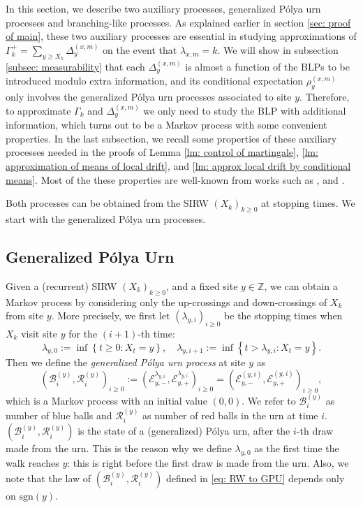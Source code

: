 \documentclass[EJP]{ejpecp} %
\begin{document}
In this section, we describe two auxiliary processes, generalized P\'{o}lya urn processes and branching-like processes. As explained earlier in section \ref{sec: proof of main}, these two auxiliary processes are essential in studying approximations of $\Gamma_k^+= \sum_{y\geq X_k} \Delta_{y}^{(x,m)}$ on the event that $\lambda_{x,m} = k$. We will show in subsection \ref{subsec: measurability} that each $\Delta^{(x,m)}_{y}$ is almost a function of the BLPs to be introduced modulo extra information, and its conditional expectation $\rho^{(x,m)}_{y}$ only involves the generalized P\'{o}lya urn processes associated to site $y$. Therefore, to approximate $\Gamma_k$ and $\Delta_{y}^{(x,m)}$ we only need to study the BLP with additional information, which turns out to be a Markov process with some convenient properties. In the last subsection, we recall some properties of these auxiliary processes needed in the proofs of Lemma \ref{lm: control of martingale}, \ref{lm: approximation of means of local drift}, and \ref{lm: approx local drift by conditional means}. Most of the these properties are well-known from works such as \cite{T96}, \cite{KP16} and \cite{KMP23}. 

Both processes can be obtained from the SIRW $(X_k)_{k\geq 0}$ at stopping times. We start with the generalized P\'{o}lya urn processes. 

\subsection{Generalized P\'{o}lya Urn}
Given a (recurrent) SIRW $(X_k)_{k\geq 0}$, and a fixed site $y\in \mathbb{Z}$, we can obtain a Markov process by considering only the up-crossings and down-crossings of $X_k$ from site $y$. More precisely, we first let $(\lambda_{y,i})_{i\geq 0}$ be the stopping times when $X_k$ visit site $y$ for the $\left( i+1 \right) $-th time:
\[
\lambda_{y,0} :=\inf\left\{ t\geq 0: X_t = y \right\} , \quad \lambda_{y,i+1} := \inf\left\{ t> \lambda_{y, i}: X_t = y \right\}.
\] 
Then we define the \textit{generalized P\'olya urn process} at site $y$ as 
\begin{equation} \label{eq: RW to GPU}
	\left(\mathscr{B}^{(y)}_{i},\mathscr{R}^{(y)}_{i} \right)_{i\ge 0}
	:=\left(\mathcal{E}^{\lambda_{y,i}}_{y,-}, \mathcal{E}^{\lambda_{y,i}}_{y,+}\right)_{i\geq 0} 
	=  \left(\mathcal{E}^{(y,i)}_{y,-}, \mathcal{E}^{(y,i)}_{y,+}\right)_{i\geq 0},
\end{equation}
which is a Markov process with an initial value $(0,0)$. 
We refer to $\mathscr{B}_{i}^{(y)}$ as number of blue balls and $\mathscr{R}_{i}^{(y)}$ as number of red balls in the urn at time $i$.
$\left(\mathscr{B}_{i}^{(y)},\mathscr{R}_{i}^{(y)} \right)$ is the state of a (generalized) P\'olya urn, after the $i$-th draw made from the urn. This is the reason why we define $\lambda_{y, 0}$ as the first time the walk reaches $y$: this is right before the first draw is made from the urn. Also, we note that the law of $\left(\mathscr{B}_{i}^{(y)},\mathscr{R}_{i}^{(y)} \right)$ defined in \eqref{eq: RW to GPU} depends only on $\text{sgn}(y)$.
\end{document}

